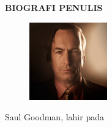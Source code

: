 \begin{center}
  \Large
  \textbf{BIOGRAFI PENULIS}
\end{center}


\vspace{2ex}

\begin{figure}
  \centering
  \vspace{-3ex}
  \includegraphics[width=0.3\textwidth]{gambar/saul.jpg}
  \vspace{-4ex}
\end{figure}

Saul Goodman, lahir pada \lipsum[1]

\lipsum[2]
